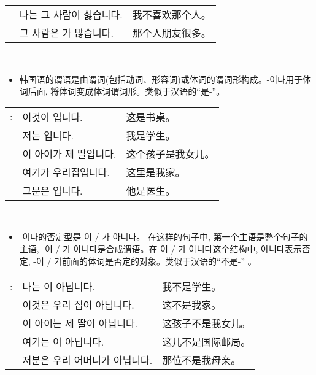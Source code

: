 \begin{grammar}
\begin{grammarsect}[\kr -이 / -가]
\begin{tabular}{lll}
            &\kr 나는 그 사람이 싫습니다.&我不喜欢那个人。\\
            &\kr 그 사람은 \ruby{親舊}{친구}가 많습니다.&那个人朋友很多。
        \end{tabular}\\
    \end{grammarsect}
    \begin{grammarsect}[\kr -이다]
        \begin{itemize}
            \item 韩国语的谓语是由谓词(包括动词、形容词)或体词的谓词形构成。{\kr -이다}用于体词后面, 将体词变成体词谓词形。类似于汉语的“是-”。
        \end{itemize}
        \begin{tabular}{lll}
            \kr \ruby{例}{예}: &\kr 이것이 \ruby{冊床}{책상}입니다.&这是书桌。\\
            &\kr 저는 \ruby{學生}{학생}입니다.&我是学生。\\
            &\kr 이 아이가 제 딸입니다.&这个孩子是我女儿。\\
            &\kr 여기가 우리집입니다.&这里是我家。\\
            &\kr 그분은 \ruby{醫師}{의사}입니다.&他是医生。
        \end{tabular}\\
    \end{grammarsect}
    \begin{grammarsect}
        \begin{itemize}
            \item {\kr -이다}的否定型是{\kr -이 / 가 아니다}。 在这样的句子中, 第一个主语是整个句子的主语, {\kr -이 / 가 아니다}是合成谓语。在{\kr -이 / 가 아니다}这个结构中, {\kr 아니다}表示否定, {\kr -이 / 가}前面的体词是否定的对象。类似于汉语的“不是-” 。
        \end{itemize}
        \begin{tabular}{lll}
            \kr \ruby{例}{예}:&\kr 나는 \ruby{學生}{학생}이 아닙니다.&我不是学生。\\
            &\kr 이것은 우리 집이 아닙니다.&这不是我家。\\
            &\kr 이 아이는 제 딸이 아닙니다.&这孩子不是我女儿。\\
            &\kr 여기는 \ruby{國際郵遞局}{국제우체국}이 아닙니다.&这儿不是国际邮局。\\
            &\kr 저분은 우리 어머니가 아닙니다.&那位不是我母亲。
        \end{tabular}\\
    \end{grammarsect}
\end{grammar}

